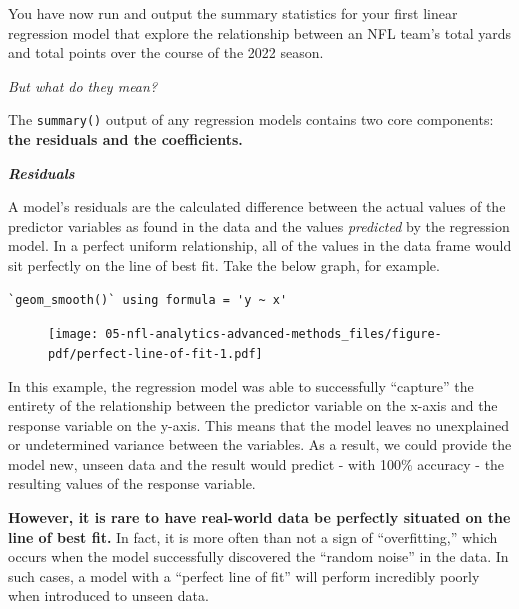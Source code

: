 \documentclass[
  letterpaper,
]{krantz}
\begin{document}
\begin{tcolorbox}[enhanced jigsaw, left=2mm, toprule=.15mm, opacitybacktitle=0.6, leftrule=.75mm, bottomrule=.15mm, colbacktitle=quarto-callout-important-color!10!white, breakable, colback=white, bottomtitle=1mm, toptitle=1mm, title=\textcolor{quarto-callout-important-color}{\faExclamation}\hspace{0.5em}{Reading \& Understanding Regression Results}, coltitle=black, titlerule=0mm, arc=.35mm, opacityback=0, colframe=quarto-callout-important-color-frame, rightrule=.15mm]

You have now run and output the summary statistics for your first linear
regression model that explore the relationship between an NFL team's
total yards and total points over the course of the 2022 season.

\emph{But what do they mean?}

The \texttt{summary()} output of any regression models contains two core
components: \textbf{the residuals and the coefficients.}

\textbf{\emph{Residuals}}

A model's residuals are the calculated difference between the actual
values of the predictor variables as found in the data and the values
\emph{predicted} by the regression model. In a perfect uniform
relationship, all of the values in the data frame would sit perfectly on
the line of best fit. Take the below graph, for example.

\begin{verbatim}
`geom_smooth()` using formula = 'y ~ x'
\end{verbatim}

\begin{figure}[H]

{\centering \texttt{[image: 05-nfl-analytics-advanced-methods\_files/figure-pdf/perfect-line-of-fit-1.pdf]}

}

\end{figure}

In this example, the regression model was able to successfully
``capture'' the entirety of the relationship between the predictor
variable on the x-axis and the response variable on the y-axis. This
means that the model leaves no unexplained or undetermined variance
between the variables. As a result, we could provide the model new,
unseen data and the result would predict - with 100\% accuracy - the
resulting values of the response variable.

\textbf{However, it is rare to have real-world data be perfectly
situated on the line of best fit.} In fact, it is more often than not a
sign of ``overfitting,'' which occurs when the model successfully
discovered the ``random noise'' in the data. In such cases, a model with
a ``perfect line of fit'' will perform incredibly poorly when introduced
to unseen data.


\end{tcolorbox}
\end{document}
